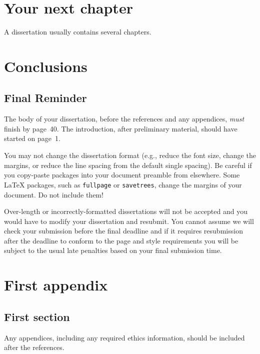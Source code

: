 \documentclass[logo,bsc,singlespacing,parskip,online]{infthesis}
\begin{document}
\chapter{Your next chapter}

A dissertation usually contains several chapters.

\chapter{Conclusions}

\section{Final Reminder}

The body of your dissertation, before the references and any appendices,
\emph{must} finish by page~40. The introduction, after preliminary material,
should have started on page~1.

You may not change the dissertation format (e.g., reduce the font size, change
the margins, or reduce the line spacing from the default single spacing). Be
careful if you copy-paste packages into your document preamble from elsewhere.
Some \LaTeX{} packages, such as \texttt{fullpage} or \texttt{savetrees}, change
the margins of your document. Do not include them!

Over-length or incorrectly-formatted dissertations will not be accepted and you
would have to modify your dissertation and resubmit. You cannot assume we will
check your submission before the final deadline and if it requires resubmission
after the deadline to conform to the page and style requirements you will be
subject to the usual late penalties based on your final submission time.

% 




\appendix

\chapter{First appendix}

\section{First section}

Any appendices, including any required ethics information, should be included
after the references.
\end{document}
